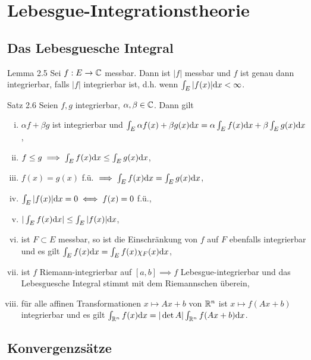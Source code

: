 \chapter{Lebesgue-Integrationstheorie}


\section{Das Lebesguesche Integral}

\begin{namedtheorem}{Lemma 2.5}
  Sei $f:E\rightarrow\mathbb{C}$ messbar. Dann ist $|f|$ messbar und $f$ ist genau dann integrierbar, falls $|f|$ integrierbar ist, d.h. wenn $\int_E|f(x)|\mathrm{d}x<\infty$.
\end{namedtheorem}

\begin{namedtheorem}{Satz 2.6}
  Seien $f,g$ integrierbar, $\alpha,\beta\in\mathbb{C}$. Dann gilt
  \begin{enumerate}[(i)]
    \item $\alpha f + \beta g$ ist integrierbar und $\int_E\alpha f(x) + \beta g(x)\mathrm{d} x = \alpha\int_Ef(x)\mathrm{d} x + \beta\int_Eg(x)\mathrm{d} x$,
    \item $f\leq g\implies \int_Ef(x)\mathrm{d} x\leq\int_Eg(x)\mathrm{d} x$,
    \item $f(x)=g(x)$ f.ü. $\implies\int_Ef(x)\mathrm{d}x=\int_Eg(x)\mathrm{d}x$,
    \item $\int_E|f(x)|\mathrm{d}x=0\iff f(x)=0$ f.ü.,
    \item $|\int_Ef(x)\mathrm{d}x|\leq\int_E|f(x)|\mathrm{d}x$,
    \item ist $F\subset E$ messbar, so ist die Einschränkung von $f$ auf $F$ ebenfalls integrierbar und es gilt $\int_Ef(x)\mathrm{d}x=\int_Ef(x)\chi_F(x)\mathrm{d}x$,
    \item ist $f$ Riemann-integrierbar auf $[a,b]\implies f$ Lebesgue-integrierbar und das Lebesguesche Integral stimmt mit dem Riemannschen überein,
    \item für alle affinen Transformationen $x\mapsto Ax+b$ von $\mathbb{R}^n$ ist $x\mapsto f(Ax+b)$ integrierbar und es gilt $\int_{\mathbb{R}^n}f(x)\mathrm{d}x=|\det A|\int_{\mathbb{R}^n}f(Ax+b)\mathrm{d}x$.
  \end{enumerate}
\end{namedtheorem}

\section{Konvergenzsätze}

